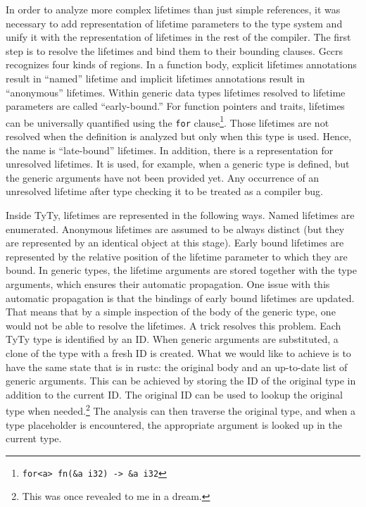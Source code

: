 \documentclass[
  11pt,
  twoside,symmetric]{report}
\begin{document}
In order to analyze more complex lifetimes than just simple references,
it was necessary to add representation of lifetime parameters to the
type system and unify it with the representation of lifetimes in the
rest of the compiler. The first step is to resolve the lifetimes and
bind them to their bounding clauses. Gccrs recognizes four kinds of
regions. In a function body, explicit lifetimes annotations result in
``named'' lifetime and implicit lifetimes annotations result in
``anonymous'' lifetimes. Within generic data types lifetimes resolved to
lifetime parameters are called ``early-bound.'' For function pointers
and traits, lifetimes can be universally quantified using the
\texttt{for} clause\footnote{\texttt{for\textless{}\textquotesingle{}a\textgreater{}\ fn(\&\textquotesingle{}a\ i32)\ -\textgreater{}\ \&\textquotesingle{}a\ i32}}.
Those lifetimes are not resolved when the definition is analyzed but
only when this type is used. Hence, the name is ``late-bound''
lifetimes. In addition, there is a representation for unresolved
lifetimes. It is used, for example, when a generic type is defined, but
the generic arguments have not been provided yet. Any occurrence of an
unresolved lifetime after type checking it to be treated as a compiler
bug.

Inside TyTy, lifetimes are represented in the following ways. Named
lifetimes are enumerated. Anonymous lifetimes are assumed to be always
distinct (but they are represented by an identical object at this
stage). Early bound lifetimes are represented by the relative position
of the lifetime parameter to which they are bound. In generic types, the
lifetime arguments are stored together with the type arguments, which
ensures their automatic propagation. One issue with this automatic
propagation is that the bindings of early bound lifetimes are updated.
That means that by a simple inspection of the body of the generic type,
one would not be able to resolve the lifetimes. A trick resolves this
problem. Each TyTy type is identified by an ID. When generic arguments
are substituted, a clone of the type with a fresh ID is created. What we
would like to achieve is to have the same state that is in rustc: the
original body and an up-to-date list of generic arguments. This can be
achieved by storing the ID of the original type in addition to the
current ID. The original ID can be used to lookup the original type when
needed.\footnote{This was once revealed to me in a dream.} The analysis
can then traverse the original type, and when a type placeholder is
encountered, the appropriate argument is looked up in the current type.
\end{document}
